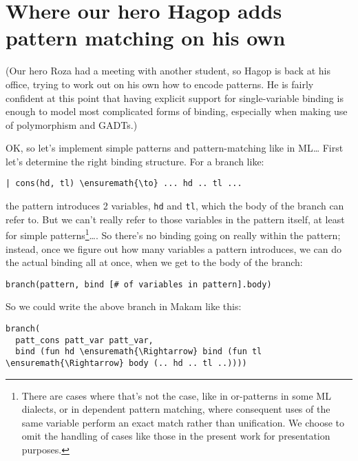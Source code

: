 \section{Where our hero Hagop adds pattern matching on his
own}\label{where-our-hero-hagop-adds-pattern-matching-on-his-own}

\begin{scenecomment}
(Our hero Roza had a meeting with another student, so Hagop is back at his
office, trying to work out on his own how to encode patterns. He is fairly
confident at this point that having explicit support for single-variable
binding is enough to model most complicated forms of binding, especially when making use of
polymorphism and GADTs.)
\end{scenecomment}

\identNormal
\heroSTUDENT{} OK, so let's implement simple patterns and pattern-matching
like in ML\ldots{} First let's determine the right binding structure.
For a branch like:

\begin{verbatim}
| cons(hd, tl) \ensuremath{\to} ... hd .. tl ...
\end{verbatim}

the pattern introduces 2 variables, \texttt{hd} and \texttt{tl}, which
the body of the branch can refer to. But we can't really refer to those
variables in the pattern itself, at least for simple
patterns\footnote{There are cases where that's not the case, like in or-patterns in some ML dialects, or in dependent pattern matching, where consequent uses of the same variable perform an exact match rather than unification. We choose to omit the handling of cases like those in the present work for presentation purposes.}\ldots{}.
So there's no binding going on really within the pattern; instead, once
we figure out how many variables a pattern introduces, we can do the
actual binding all at once, when we get to the body of the branch:

\begin{verbatim}
branch(pattern, bind [# of variables in pattern].body)
\end{verbatim}

So we could write the above branch in Makam like this:

\begin{verbatim}
branch(
  patt_cons patt_var patt_var,
  bind (fun hd \ensuremath{\Rightarrow} bind (fun tl \ensuremath{\Rightarrow} body (.. hd .. tl ..))))
\end{verbatim}


